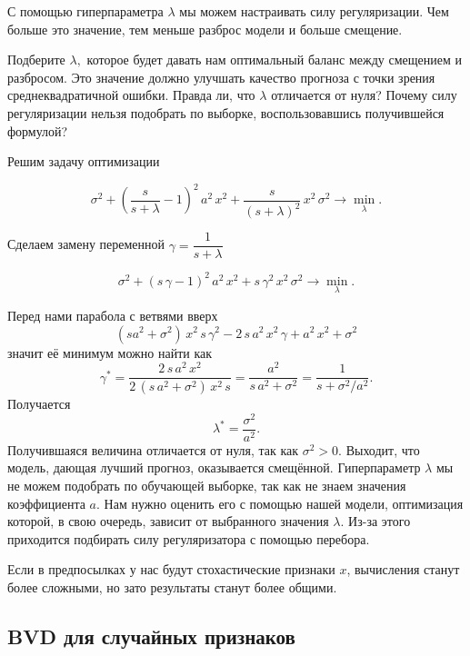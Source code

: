 \documentclass[12pt,fleqn]{article}
\begin{document}
С помощью гиперпараметра $\lambda$ мы можем настраивать силу регуляризации.
Чем больше это значение, тем меньше разброс модели и больше смещение.

\begin{vkProblem}
    Подберите $\lambda,$ которое будет давать нам оптимальный баланс между смещением и разбросом.
    Это значение должно улучшать качество прогноза с точки зрения среднеквадратичной ошибки.
    Правда ли, что $\lambda$ отличается от нуля?
    Почему силу регуляризации нельзя подобрать по выборке, воспользовавшись получившейся формулой?
\end{vkProblem}
\begin{esSolution}
    Решим задачу оптимизации 
    
    $$
    \sigma^2 + \left(\dfrac{s}{s + \lambda} - 1\right)^2\, a^2\, x^2 + \dfrac{s}{(s + \lambda)^2} \, x^2 \, \sigma^2  \to \min_{\lambda}.
    $$

    Сделаем замену переменной $\gamma = \dfrac{1}{s + \lambda}$

    $$
    \sigma^2 + \left(s \, \gamma - 1\right)^2\, a^2\, x^2 + s \, \gamma^2 \, x^2 \, \sigma^2  \to \min_{\lambda}.
    $$
    
    \noindent Перед нами парабола с ветвями вверх
    $$
    (s a^2 + \sigma^2) \, x^2 \, s \, \gamma^2 - 2 \, s \, a^2 \, x^2 \, \gamma + a^2 \, x^2 + \sigma^2
    $$
    значит её минимум можно найти как
    $$
    \gamma^{*} = \dfrac{2 \, s \, a^2 \, x^2}{2 \, (s \, a^2 + \sigma^2) \, x^2 \, s} = \dfrac{a^2}{s \, a^2 + \sigma^2} =  \dfrac{1}{s  + \sigma^2/a^2}.
    $$
    Получается
    $$
    \lambda^{*} = \dfrac{\sigma^2}{a^2}.
    $$
    Получившаяся величина отличается от нуля, так как $\sigma^2 > 0.$
    Выходит, что модель, дающая лучший прогноз, оказывается смещённой.
    Гиперпараметр $\lambda$ мы не можем подобрать по обучающей выборке, так как не знаем значения коэффициента $a$.
    Нам нужно оценить его с помощью нашей модели, оптимизация которой, в свою очередь, зависит от выбранного значения $\lambda.$
    Из-за этого приходится подбирать силу регуляризатора с помощью перебора.
\end{esSolution}

Если в предпосылках у нас будут стохастические признаки $x$, вычисления станут более сложными, но зато результаты станут более общими. 

\subsection{BVD для случайных признаков}
\end{document}
